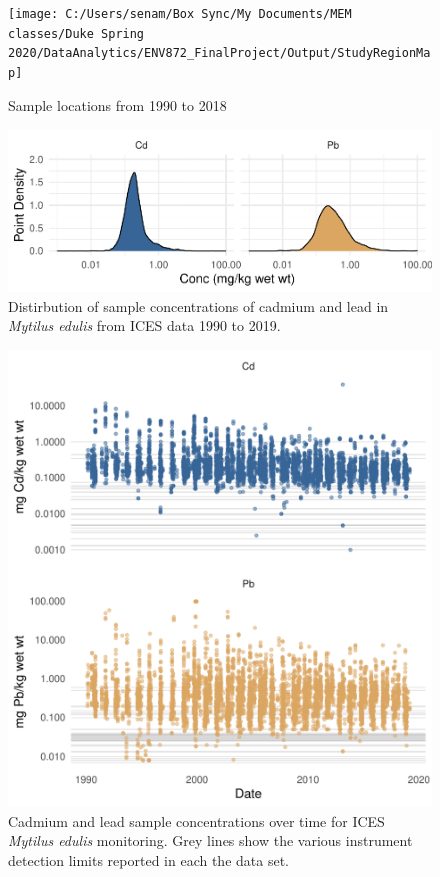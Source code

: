 \documentclass[
  12pt,
]{article}
\begin{document}
\begin{figure}
\texttt{[image: C:/Users/senam/Box Sync/My Documents/MEM classes/Duke Spring 2020/DataAnalytics/ENV872\_FinalProject/Output/StudyRegionMap]} \caption{Sample locations from 1990 to 2018}\label{fig:unnamed-chunk-2}
\end{figure}

\begin{figure}
\centering
\includegraphics{McCrory_ENV972_Project_files/figure-latex/unnamed-chunk-3-1.pdf}
\caption{Distirbution of sample concentrations of cadmium and lead in
\emph{Mytilus edulis} from ICES data 1990 to 2019.}
\end{figure}

\begin{figure}
\centering
\includegraphics{McCrory_ENV972_Project_files/figure-latex/unnamed-chunk-4-1.pdf}
\caption{Cadmium and lead sample concentrations over time for ICES
\emph{Mytilus edulis} monitoring. Grey lines show the various instrument
detection limits reported in each the data set.}
\end{figure}
\end{document}
